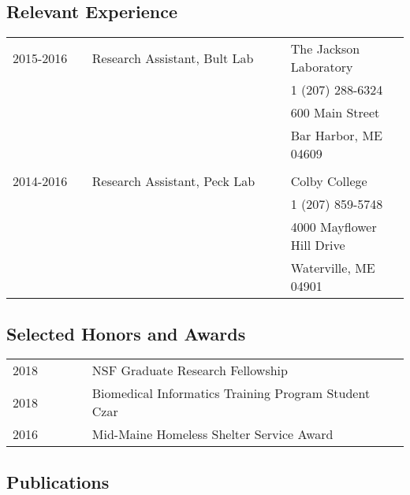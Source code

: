 \documentclass[12pt,]{scrartcl}
\begin{document}
\subsection{Relevant Experience}\label{relevant-experience}

\begin{table}[!h]
{\def\arraystretch{0.9}\tabcolsep=4pt
\begin{tabular}{p{0.2\linewidth}p{0.5\linewidth}p{0.3\linewidth}}
  2015-2016 & Research Assistant, Bult Lab & The Jackson Laboratory\\
   & & 1 (207) 288-6324 \\
  & & 600 Main Street \\
  & & Bar Harbor, ME 04609\\
  \\
  2014-2016 & Research Assistant, Peck Lab & Colby College\\
  & & 1 (207) 859-5748 \\
  & & 4000 Mayflower Hill Drive \\
  & & Waterville, ME 04901 \\
\end{tabular}%
}
\end{table}

\subsection{Selected Honors and
Awards}\label{selected-honours-and-awards}

\begin{table}[!h]
{\def\arraystretch{1.5}\tabcolsep=4pt
\begin{tabular}{p{0.2\linewidth}p{0.8\linewidth}}
  2018 & NSF Graduate Research Fellowship \\
  2018 & Biomedical Informatics Training Program Student Czar \\
  2016 & Mid-Maine Homeless Shelter Service Award\\

\end{tabular}%
}
\end{table}

\subsection{Publications}\label{publications}
\vspace*{-4em}

\end{document}
